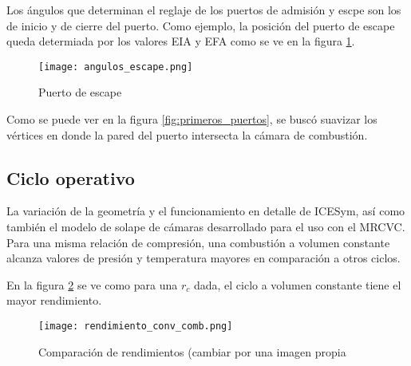 Los ángulos que determinan el reglaje de los puertos de admisión y escpe
son los de inicio y de cierre del puerto.
%
Como ejemplo, la posición del puerto de escape queda determiada por los 
valores EIA y EFA como se ve en la figura \ref{fig:angulos_escape}.

\begin{figure}
    \centering
    \texttt{[image: angulos\_escape.png]}
    \caption{Puerto de escape}
    \label{fig:angulos_escape}
\end{figure}

Como se puede ver en la figura \ref{fig:primeros_puertos}, se buscó suavizar
los vértices en donde la pared del puerto intersecta la cámara de combustión.
%


\subsection{Ciclo operativo}
%
La variación de la geometría y el funcionamiento en detalle de ICESym, así como
también el modelo de solape de cámaras desarrollado para el uso con el MRCVC.
%
Para una misma relación de compresión, una combustión a volumen constante
alcanza valores de presión y temperatura mayores en comparación a otros ciclos.
%


En la figura \ref{fig:comparacion_rendimientos} se ve como para una $r_c$ dada,
el ciclo a volumen constante tiene el mayor rendimiento.

\begin{figure}
    \centering
    \texttt{[image: rendimiento\_conv\_comb.png]}
    \caption{Comparación de rendimientos (cambiar por una imagen propia}
    \label{fig:comparacion_rendimientos}
\end{figure}


%
%
%
%

